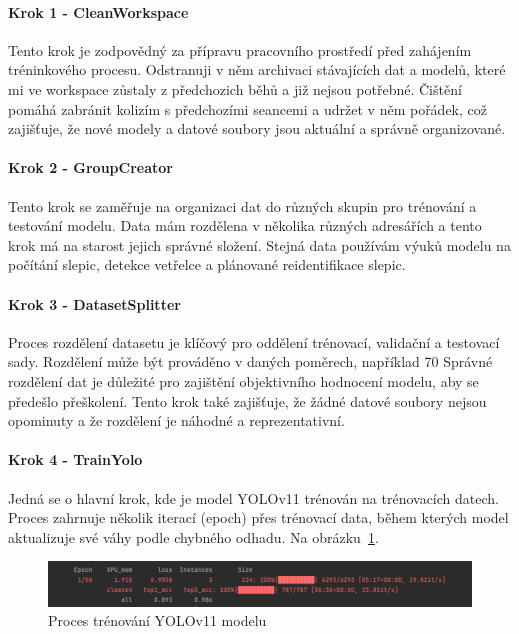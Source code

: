 \paragraph{Krok 1 - CleanWorkspace}

Tento krok je zodpovědný za přípravu pracovního prostředí před zahájením tréninkového procesu.
Odstranuji v něm archivaci stávajících dat a modelů, které mi ve workspace zůstaly z předchozich běhů a již nejsou potřebné.
Čištění pomáhá zabránit kolizím s předchozími seancemi a udržet v něm pořádek, což zajišťuje, že nové modely a datové soubory jsou aktuální a správně organizované.

\paragraph{Krok 2 - GroupCreator}

Tento krok se zaměřuje na organizaci dat do různých skupin pro trénování a testování modelu.
Data mám rozdělena v několika různých adresářích a tento krok má na starost jejich správné složení.
Stejná data používám výuků modelu na počítání slepic, detekce vetřelce a plánované reidentifikace slepic.

\paragraph{Krok 3 - DatasetSplitter}

Proces rozdělení datasetu je klíčový pro oddělení trénovací, validační a testovací sady.
Rozdělení může být prováděno v daných poměrech, například 70%
Správné rozdělení dat je důležité pro zajištění objektivního hodnocení modelu, aby se předešlo přeškolení.
Tento krok také zajišťuje, že žádné datové soubory nejsou opominuty a že rozdělení je náhodné a reprezentativní.

\paragraph{Krok 4 - TrainYolo}

Jedná se o hlavní krok, kde je model YOLOv11 trénován na trénovacích datech.
Proces zahrnuje několik iterací (epoch) přes trénovací data, během kterých model aktualizuje své váhy podle chybného odhadu.
Na obrázku~\ref{fig:train_yolo}.


\begin{figure}[h]
    \centering
    \includegraphics[width=\textwidth]{img/train_yolo}
    \caption{Proces trénování YOLOv11 modelu}
    \label{fig:train_yolo}
\end{figure}

